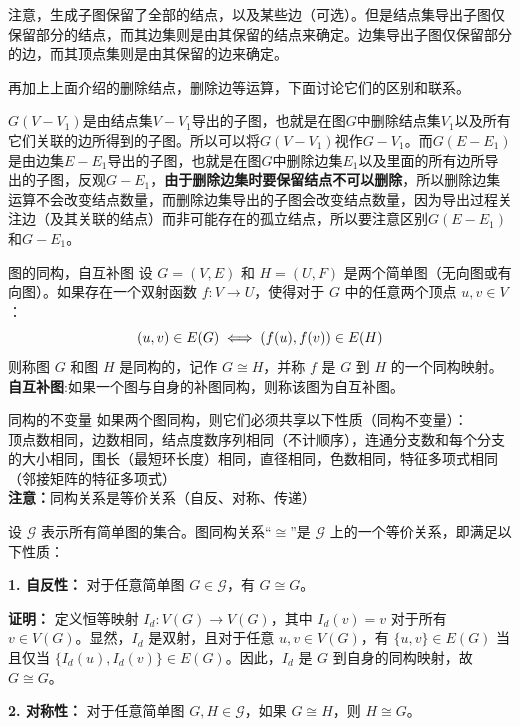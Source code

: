 \documentclass[lang=cn,11pt]{elegantbook}
\begin{document}
注意，生成子图保留了全部的结点，以及某些边（可选）。但是结点集导出子图仅保留部分的结点，而其边集则是由其保留的结点来确定。边集导出子图仅保留部分的边，而其顶点集则是由其保留的边来确定。

再加上上面介绍的删除结点，删除边等运算，下面讨论它们的区别和联系。

$G(V-V_1)$是由结点集$V-V_1$导出的子图，也就是在图$G$中删除结点集$V_1$以及所有它们关联的边所得到的子图。所以可以将$G(V-V_1)$视作$G-V_1$。而$G(E-E_1)$是由边集$E-E_1$导出的子图，也就是在图$G$中删除边集$E_1$以及里面的所有边所导出的子图，反观$G-E_1$，\textbf{由于删除边集时要保留结点不可以删除}，所以删除边集运算不会改变结点数量，而删除边集导出的子图会改变结点数量，因为导出过程关注边（及其关联的结点）而非可能存在的孤立结点，所以要注意区别$G(E-E_1)$和$G-E_1$。
\begin{definition}{图的同构，自互补图}
设 $G = (V, E)$ 和 $H = (U, F)$ 是两个简单图（无向图或有向图）。如果存在一个双射函数 $f: V \to U$，使得对于 $G$ 中的任意两个顶点 $u, v \in V$：\vspace{-10pt}
\[
(u,v) \in E(G) \iff (f(u), f(v)) \in E(H)\vspace{-10pt}
\]
则称图 $G$ 和图 $H$ 是同构的，记作 $G \cong H$，并称 $f$ 是 $G$ 到 $H$ 的一个同构映射。\\
\textbf{自互补图}:如果一个图与自身的补图同构，则称该图为自互补图。
\end{definition}
\begin{theorem}{同构的不变量}
如果两个图同构，则它们必须共享以下性质（同构不变量）：\\
顶点数相同，边数相同，结点度数序列相同（不计顺序），连通分支数和每个分支的大小相同，围长（最短环长度）相同，直径相同，色数相同，特征多项式相同（邻接矩阵的特征多项式）\\
\textbf{注意：}同构关系是等价关系（自反、对称、传递）
\end{theorem}
设 $\mathcal{G}$ 表示所有简单图的集合。图同构关系“$\cong$”是 $\mathcal{G}$ 上的一个等价关系，即满足以下性质：

\textbf{1. 自反性：} 对于任意简单图 $G \in \mathcal{G}$，有 $G \cong G$。

\textbf{证明：}
定义恒等映射 $I_d: V(G) \to V(G)$，其中 $I_d(v) = v$ 对于所有 $v \in V(G)$。显然，$I_d$ 是双射，且对于任意 $u, v \in V(G)$，有 $\{u, v\} \in E(G)$ 当且仅当 $\{I_d(u), I_d(v)\} \in E(G)$。因此，$I_d$ 是 $G$ 到自身的同构映射，故 $G \cong G$。

\textbf{2. 对称性：} 对于任意简单图 $G, H \in \mathcal{G}$，如果 $G \cong H$，则 $H \cong G$。
\end{document}
